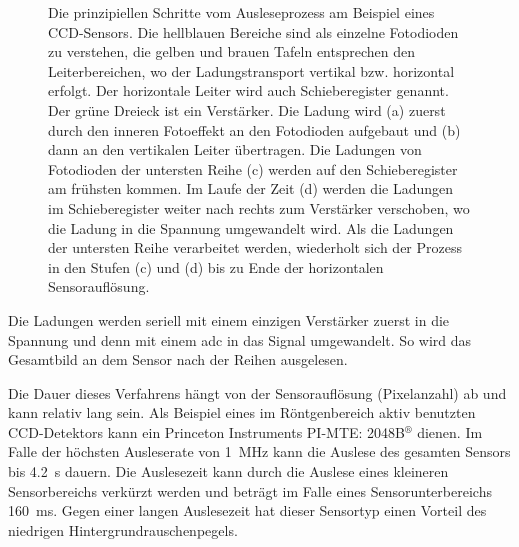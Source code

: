 \begin{figure}[H]
    \caption{Die prinzipiellen Schritte vom Ausleseprozess am Beispiel eines  CCD-Sensors. Die hellblauen Bereiche sind als einzelne Fotodioden zu verstehen, die gelben und brauen Tafeln entsprechen den Leiterbereichen, wo der Ladungstransport vertikal bzw. horizontal erfolgt. Der horizontale Leiter wird auch Schieberegister genannt. Der grüne Dreieck ist ein Verstärker. Die Ladung wird (a) zuerst durch den inneren Fotoeffekt an den Fotodioden aufgebaut und (b) dann an den vertikalen Leiter übertragen. Die Ladungen von Fotodioden der untersten Reihe (c) werden auf den Schieberegister am frühsten kommen. Im Laufe der Zeit (d) werden die Ladungen im Schieberegister weiter nach rechts zum Verstärker verschoben, wo die Ladung in die Spannung umgewandelt wird. Als die Ladungen der untersten Reihe verarbeitet werden, wiederholt sich der Prozess in den Stufen (c) und (d) bis zu Ende der horizontalen Sensorauflösung.}
    \label{fig:ccd_scheme}
\end{figure}
\noindent
Die Ladungen werden seriell mit einem einzigen Verstärker zuerst in die Spannung und denn mit einem \gls{adc} in das Signal umgewandelt. So wird das Gesamtbild an dem Sensor nach der Reihen ausgelesen.

\noindent
Die Dauer dieses Verfahrens hängt von der Sensorauflösung (Pixelanzahl) ab und kann relativ lang sein. Als Beispiel eines im Röntgenbereich aktiv benutzten CCD-Detektors kann ein Princeton Instruments
PI-MTE: 2048B$^{\text{®}}$ dienen. Im Falle der höchsten Ausleserate von \SI{1}{\mega\hertz} \cite[s. 81, Readout charakterstik]{mte-manual} kann die Auslese des gesamten Sensors  bis \SI{4,2}{\second} dauern. Die Auslesezeit kann  durch die Auslese eines kleineren Sensorbereichs verkürzt werden und beträgt im Falle eines  Sensorunterbereichs \SI{160}{\milli\second}. Gegen einer langen Auslesezeit hat dieser Sensortyp einen Vorteil des niedrigen Hintergrundrauschenpegels.

